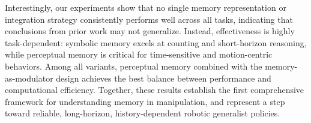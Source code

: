 Interestingly, our experiments show that no single memory representation or integration strategy consistently performs well across all tasks, indicating that conclusions from prior work may not generalize. Instead, effectiveness is highly task-dependent: symbolic memory excels at counting and short-horizon reasoning, while perceptual memory is critical for time-sensitive and motion-centric behaviors. Among all variants, perceptual memory combined with the memory-as-modulator design achieves the best balance between performance and computational efficiency. Together, these results establish the first comprehensive framework for understanding memory in manipulation, and represent a step toward reliable, long-horizon, history-dependent robotic generalist policies.
